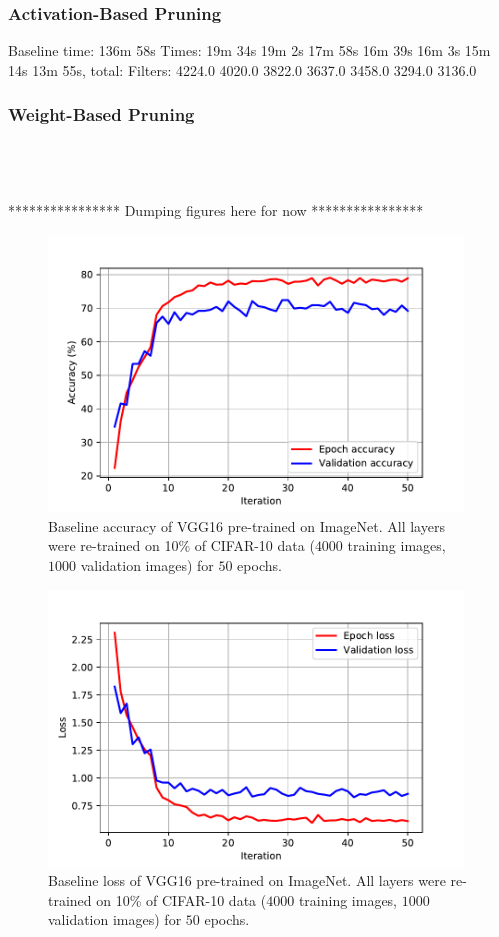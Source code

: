 \documentclass{article}
\begin{document}
\subsubsection{Activation-Based Pruning}
Baseline time: 136m 58s
Times: 19m 34s   19m 2s   17m 58s   16m 39s   16m 3s   15m 14s   13m 55s, total: 
Filters: 4224.0   4020.0   3822.0   3637.0   3458.0   3294.0   3136.0
\subsubsection{Weight-Based Pruning}

\ \\ 
\ \\
\ \\
**************** Dumping figures here for now ****************

\begin{figure}[!t]
	\centering
	\includegraphics[width=11cm]{./results/baseline_pre_out_1_in_50_cifar10_10percent_acc.pdf}
	\caption{Baseline accuracy of VGG16 pre-trained on ImageNet. All layers were re-trained on 10\% of CIFAR-10 data ($4000$ training images, $1000$ validation images) for $50$ epochs.}
\end{figure}

\begin{figure}[!t]
	\centering
	\includegraphics[width=11cm]{./results/baseline_pre_out_1_in_50_cifar10_10percent_loss.pdf}
	\caption{Baseline loss of VGG16 pre-trained on ImageNet. All layers were re-trained on 10\% of CIFAR-10 data ($4000$ training images, $1000$ validation images) for $50$ epochs.}
\end{figure}
\end{document}
